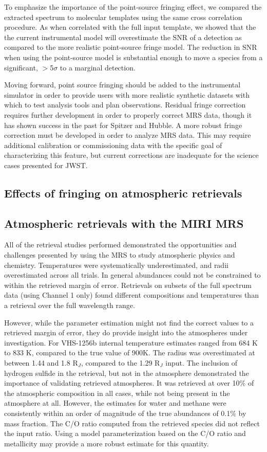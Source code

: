 To emphasize the importance of the point-source fringing effect, we compared the extracted spectrum to molecular templates using the same cross correlation procedure.
As when correlated with the full input template, we showed that the the current instrumental model will overestimate the SNR of a detection as compared to the more realistic point-source fringe model. 
The reduction in SNR when using the point-source model is substantial enough to move a species from a significant, $>$5$\sigma$ to a marginal detection.

Moving forward, point source fringing should be added to the instrumental simulator in order to provide users with more realistic synthetic datasets with which to test analysis tools and plan observations. 
Residual fringe correction requires further development in order to properly correct MRS data, though it has shown success in the past for Spitzer and Hubble.
A more robust fringe correction must be developed in order to analyze MRS data.
This may require additional calibration or commissioning data with the specific goal of characterizing this feature, but current corrections are inadequate for the science cases presented for JWST.

\subsection{Effects of fringing on atmospheric retrievals}
\subsection{Atmospheric retrievals with the MIRI MRS}
All of the retrieval studies performed demonstrated the opportunities and challenges presented by using the MRS to study atmospheric physics and chemistry.
Temperatures were systematically underestimated, and radii overestimated across all trials.
In general abundances could not be constrained to within the retrieved margin of error.
Retrievals on subsets of the full spectrum data (using Channel 1 only) found different compositions and temperatures than a retrieval over the full wavelength range.

However, while the parameter estimation might not find the correct values to a retrieved margin of error, they do provide insight into the atmospheres under investigation.
For VHS-1256b internal temperature estimates ranged from 684 K to 833 K, compared to the true value of 900K. 
The radius was overestimated at between 1.44 and 1.8 R$_{J}$, compared to the 1.29 R$_{J}$ input.
The inclusion of hydrogen sulfide in the retrieval, but not in the atmosphere demonstrated the importance of validating retrieved atmospheres. 
It was retrieved at over 10\% of the atmospheric composition in all cases, while not being present in the atmosphere at all.
However, the estimates for water and methane were consistently within an order of magnitude of the true abundances of 0.1\% by mass fraction.
The C/O ratio computed from the retrieved species did not reflect the input ratio.
Using a model parameterization based on the C/O ratio and metallicity may provide a more robust estimate for this quantity.

